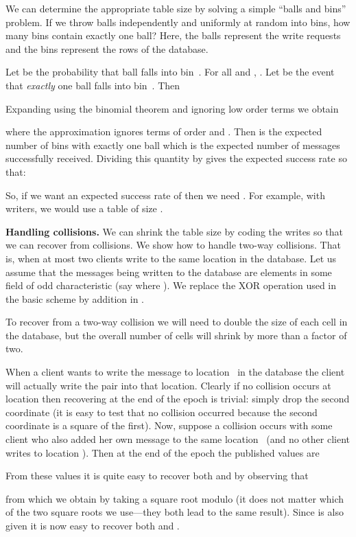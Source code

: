 \documentclass[10pt,twocolumn]{article}
\newcommand{\nicepara}[1]{\medskip\noindent\textbf{#1.}}
\begin{document}
We can determine the appropriate table size by solving
a simple ``balls and bins'' problem.
If we throw  balls independently and uniformly at
random into  bins, how many bins contain exactly one ball?
Here, the  balls represent the write requests
and the  bins represent the rows of the database.

Let  be the probability that ball 
falls into bin~. For all  and , .
Let  be the event that {\em exactly} one ball falls
into bin~.  Then

Expanding using the binomial theorem and ignoring low order terms
we obtain 

where the approximation ignores terms of order  and .
Then  is the expected number of bins
with exactly one ball which is the expected number of messages 
successfully received.  
Dividing this quantity by  gives the expected success rate so that:

So, if we want an expected success rate of  then we need
.  For example, with  writers,
we would use a table of size . 



\nicepara{Handling collisions}  We can shrink the table
size  by coding the writes so that we can recover from collisions.
We show how to handle two-way collisions. 
That is, when at most two
clients write to the same location in the database.  Let us assume
that the messages being written to the database are elements in some
field  of odd characteristic (say  where ).
We replace the XOR operation used in the basic scheme
by addition in .   

To recover from a two-way collision we will need to double the size of
each cell in the database, but the overall number of cells  will
shrink by more than a factor of two.

When a client  wants to write the message
 to location~ in the database the client will
actually write the pair  into that location.  
Clearly if no
collision occurs at location  then recovering  at the end
of the epoch is trivial: simply drop the second coordinate (it is easy
to test that no collision occurred because the second coordinate is a
square of the first).  Now, suppose a collision occurs with some
client  who also added her own message  to
the same location~ (and no other client writes to location
).  Then at the end of the epoch the published values are

From these values it is quite easy to recover both  and 
by observing that

from which we obtain  by taking a square root modulo  (it does not
matter which of the two square roots we use---they both lead to the
same result).  Since  is also given it is now easy to
recover both  and .
\end{document}
